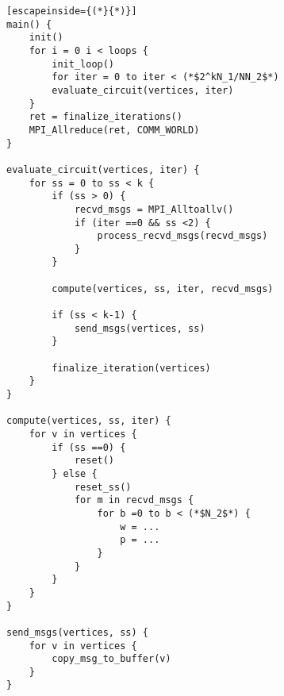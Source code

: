 \documentclass{article}
\begin{document}
\begin{lstlisting}[escapeinside={(*}{*)}]
main() {
    init()
    for i = 0 i < loops {
    	init_loop()
        for iter = 0 to iter < (*$2^kN_1/NN_2$*)
        evaluate_circuit(vertices, iter)
    }
    ret = finalize_iterations()
    MPI_Allreduce(ret, COMM_WORLD)
}

evaluate_circuit(vertices, iter) {
    for ss = 0 to ss < k {
        if (ss > 0) {
            recvd_msgs = MPI_Alltoallv()
            if (iter ==0 && ss <2) {
                process_recvd_msgs(recvd_msgs)
            }        
        }
        
        compute(vertices, ss, iter, recvd_msgs)
        
        if (ss < k-1) {
            send_msgs(vertices, ss)
        }
        
        finalize_iteration(vertices)
    }
}

compute(vertices, ss, iter) {
    for v in vertices {
        if (ss ==0) {
            reset()        
        } else {
            reset_ss()
            for m in recvd_msgs {
                for b =0 to b < (*$N_2$*) {
                    w = ...
                    p = ...
                }
            }
        }   
    }
}

send_msgs(vertices, ss) {
    for v in vertices {
        copy_msg_to_buffer(v)    
    }
}


\end{lstlisting}
\end{document}

